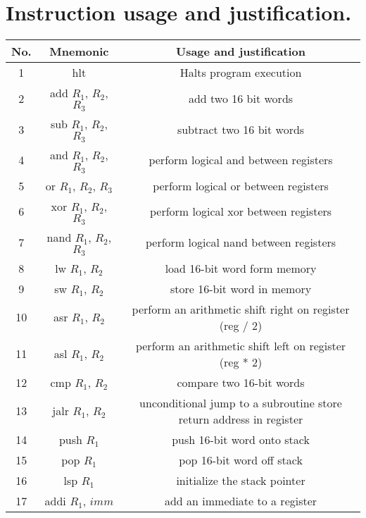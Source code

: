 \documentclass{article}
\begin{document}
\section{Instruction usage and justification.}
\label{insuj}
\begin{par}
	\begin{center}
		\begin{tabular}{|c|c|c|}
			\hline
			\textbf{No.} & \textbf{Mnemonic} & \textbf{Usage and justification} \\
			\hline 
			1 & hlt & Halts program execution \\
			\hline 
			2 & add $ R_{1} $, $ R_{2} $, $ R_{3} $ & add two 16 bit words \\
			\hline
			3 & sub $ R_{1} $, $ R_{2} $, $ R_{3} $ & subtract two 16 bit words \\
			\hline
			4 & and $ R_{1} $, $ R_{2} $, $ R_{3} $ & perform logical and between registers \\
			\hline
			5 & or $ R_{1} $, $ R_{2} $, $ R_{3} $ & perform logical or between registers \\
			\hline
			6 & xor $ R_{1} $, $ R_{2} $, $ R_{3} $ & perform logical xor between registers \\
			\hline
			7 & nand $ R_{1} $, $ R_{2} $, $ R_{3} $ & perform logical nand between registers \\
			\hline
			8 & lw $ R_{1} $, $ R_{2} $ & load 16-bit word form memory \\
			\hline
			9 & sw $ R_{1} $, $ R_{2} $ & store 16-bit word in memory \\
			\hline
			10 & asr $ R_{1} $, $ R_{2} $ & perform an arithmetic shift right on register (reg / 2) \\
			\hline
			11 & asl $ R_{1} $, $ R_{2} $ & perform an arithmetic shift left on register (reg * 2) \\
			\hline
			12 & cmp $ R_{1} $, $ R_{2} $ & compare two 16-bit words \\
			\hline
			13 & jalr $ R_{1} $, $ R_{2} $ & unconditional jump to a subroutine store return address in register \\
			\hline
			14 & push $ R_{1} $ & push 16-bit word onto stack \\
			\hline
			15 & pop $ R_{1} $ & pop 16-bit word off stack \\
			\hline
			16 & lsp $ R_{1} $ & initialize the stack pointer \\
			\hline
			17 & addi $ R_{1} $, $ imm $ & add an immediate to a register  \\

\end{tabular}
\end{center}
\end{par}
\end{document}
